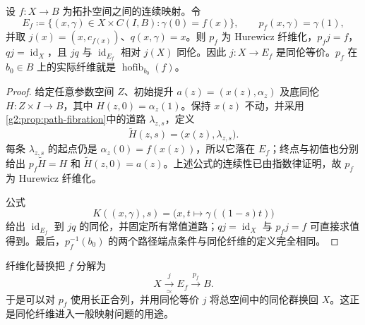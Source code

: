 \begin{proposition}\label{g2:prop:fibration-replacement}
	设 \(f:X\rightarrow B\) 为拓扑空间之间的连续映射。令
	\[
		E_f\coloneqq\{(x,\gamma)\in X\times C(I,B):\gamma(0)=f(x)\},
		\qquad p_f(x,\gamma)=\gamma(1),
	\]
	并取 \(j(x)=(x,c_{f(x)})\)、\(q(x,\gamma)=x\)。则 \(p_f\) 为 Hurewicz 纤维化，\(p_fj=f\)，\(qj=\operatorname{id}_X\)，且 \(jq\) 与 \(\operatorname{id}_{E_f}\) 相对 \(j(X)\) 同伦。因此 \(j:X\rightarrow E_f\) 是同伦等价。\(p_f\) 在 \(b_0\in B\) 上的实际纤维就是 \(\operatorname{hofib}_{b_0}(f)\)。
\end{proposition}
\begin{proof}
	给定任意参数空间 \(Z\)、初始提升 \(a(z)=(x(z),\alpha_z)\) 及底同伦 \(H:Z\times I\rightarrow B\)，其中 \(H(z,0)=\alpha_z(1)\)。保持 \(x(z)\) 不动，并采用\cref{g2:prop:path-fibration}中的道路 \(\lambda_{z,s}\)，定义
	\[
		\widetilde H(z,s)=\bigl(x(z),\lambda_{z,s}\bigr).
	\]
	每条 \(\lambda_{z,s}\) 的起点仍是 \(\alpha_z(0)=f(x(z))\)，所以它落在 \(E_f\)；终点与初值也分别给出 \(p_f\widetilde H=H\) 和 \(\widetilde H(z,0)=a(z)\)。上述公式的连续性已由指数律证明，故 \(p_f\) 为 Hurewicz 纤维化。

	公式
	\[
		K((x,\gamma),s)=\bigl(x,t\mapsto\gamma((1-s)t)\bigr)
	\]
	给出 \(\operatorname{id}_{E_f}\) 到 \(jq\) 的同伦，并固定所有常值道路；\(qj=\operatorname{id}_X\) 与 \(p_fj=f\) 可直接求值得到。最后，\(p_f^{-1}(b_0)\) 的两个路径端点条件与同伦纤维的定义完全相同。
\end{proof}

纤维化替换把 \(f\) 分解为
\[
	X\xrightarrow[\simeq]{\ j\ }E_f\xrightarrow{\ p_f\ }B.
\]
于是可以对 \(p_f\) 使用长正合列，并用同伦等价 \(j\) 将总空间中的同伦群换回 \(X\)。这正是同伦纤维进入一般映射问题的用途。
